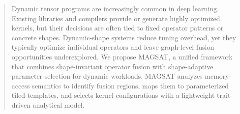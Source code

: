 \documentclass[sigconf,review, anonymous]{acmart}
\begin{document}
\begin{abstract}
Dynamic tensor programs are increasingly common in deep learning.
Existing libraries and compilers provide or generate
highly optimized kernels, but their decisions are often tied to fixed operator
patterns or concrete shapes. Dynamic-shape systems reduce tuning overhead, yet
they typically optimize individual operators and leave graph-level fusion
opportunities underexplored. 
We propose MAGSAT, a unified framework that combines shape-invariant operator fusion with shape-adaptive parameter selection for dynamic workloads.
MAGSAT analyzes memory-access semantics to identify
fusion regions, maps them to parameterized tiled templates,
and selects kernel configurations
with a lightweight trait-driven analytical model. 

\end{abstract}
\end{document}
